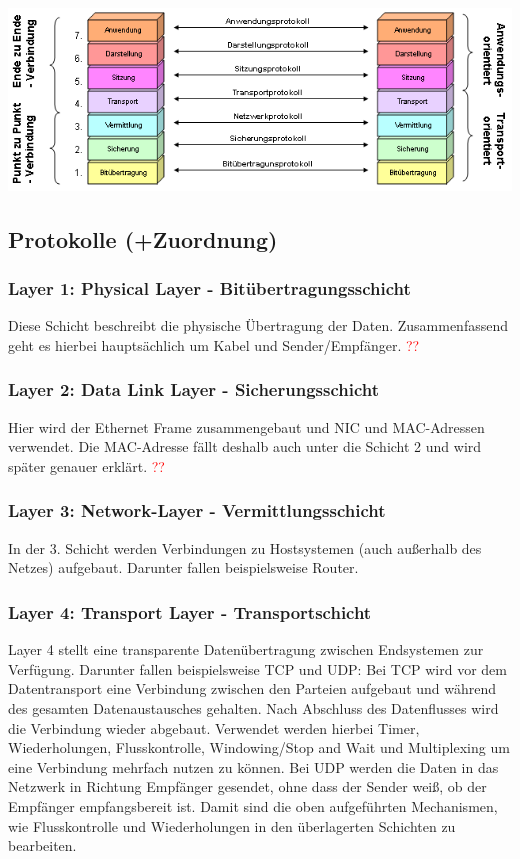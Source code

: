 \documentclass[12pt,a4paper]{article}
\begin{document}
			\includegraphics[scale=.75]{Bilder/OSI-Modell2} %

		\subsection{Protokolle (+Zuordnung)}
			\subsubsection{Layer 1: Physical Layer - Bitübertragungsschicht}
				Diese Schicht beschreibt die physische Übertragung der Daten. Zusammenfassend geht es hierbei hauptsächlich um Kabel und Sender/Empfänger. \textcolor{red}{??}

			\subsubsection{Layer 2: Data Link Layer - Sicherungsschicht}
				Hier wird der Ethernet Frame zusammengebaut und NIC und MAC-Adressen verwendet. Die MAC-Adresse fällt deshalb auch unter die Schicht 2 und wird später genauer erklärt. \textcolor{red}{??}

			\subsubsection{Layer 3: Network-Layer - Vermittlungsschicht}
				In der 3. Schicht werden Verbindungen zu Hostsystemen (auch außerhalb des Netzes) aufgebaut. Darunter fallen beispielsweise Router.

			\subsubsection{Layer 4: Transport Layer - Transportschicht}
				Layer 4 stellt eine transparente Datenübertragung zwischen Endsystemen zur Verfügung. Darunter fallen beispielsweise TCP und UDP:\newline\newline
				Bei TCP wird vor dem Datentransport eine Verbindung zwischen den Parteien aufgebaut und während des gesamten Datenaustausches gehalten. Nach Abschluss des Datenflusses wird die Verbindung wieder abgebaut. Verwendet werden hierbei Timer, Wiederholungen, Flusskontrolle, Windowing/Stop and Wait und Multiplexing um eine Verbindung mehrfach nutzen zu können.\newline\newline
				Bei UDP werden die Daten in das Netzwerk in Richtung Empfänger gesendet, ohne dass der Sender weiß, ob der Empfänger empfangsbereit ist. Damit sind die oben aufgeführten Mechanismen, wie Flusskontrolle und Wiederholungen in den überlagerten Schichten zu bearbeiten.
\end{document}
